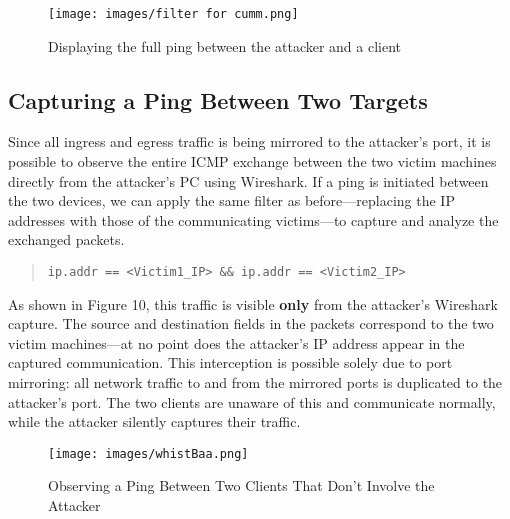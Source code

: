\documentclass[a4paper]{article}
\newcommand{\abc}{\hfill \break}
\begin{document}
\begin{figure}[!htbp]
	\texttt{[image: images/filter for cumm.png]}
	\centering
	\caption{Displaying the full ping between the attacker and a client}
\end{figure} \abc \newpage
\subsection{Capturing a Ping Between Two Targets}
Since all ingress and egress traffic is being mirrored to the attacker's port, it is possible to observe the entire ICMP exchange between the two victim machines directly from the attacker's PC using Wireshark. If a ping is initiated between the two devices, we can apply the same filter as before—replacing the IP addresses with those of the communicating victims—to capture and analyze the exchanged packets.\abc
\begin{quote}
\texttt{ip.addr == <Victim1\_IP> \&\& ip.addr == <Victim2\_IP>}
\end{quote}\abc
As shown in Figure 10, this traffic is visible \textbf{only} from the attacker's Wireshark capture. The source and destination fields in the packets correspond to the two victim machines—at no point does the attacker’s IP address appear in the captured communication. This interception is possible solely due to port mirroring: all network traffic to and from the mirrored ports is duplicated to the attacker's port. The two clients are unaware of this and communicate normally, while the attacker silently captures their traffic.
\begin{figure}[!htbp]
	\texttt{[image: images/whistBaa.png]}
	\centering
	\caption{Observing a Ping Between Two Clients That Don't Involve the Attacker}
\end{figure} \abc \newpage
\end{document}

